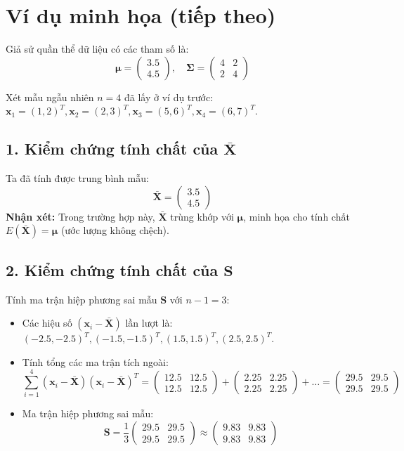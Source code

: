 \section*{Ví dụ minh họa (tiếp theo)}

Giả sử quần thể dữ liệu có các tham số là:
\[
\bm{\mu} = \begin{pmatrix} 3.5 \\ 4.5 \end{pmatrix}, \quad \bm{\Sigma} = \begin{pmatrix} 4 & 2 \\ 2 & 4 \end{pmatrix}
\]

Xét mẫu ngẫu nhiên $n=4$ đã lấy ở ví dụ trước:
$\bm{x}_1 = (1, 2)^T, \bm{x}_2 = (2, 3)^T, \bm{x}_3 = (5, 6)^T, \bm{x}_4 = (6, 7)^T$.

\subsection*{1. Kiểm chứng tính chất của $\bar{\bm{X}}$}
Ta đã tính được trung bình mẫu:
\[
\bar{\bm{X}} = \begin{pmatrix} 3.5 \\ 4.5 \end{pmatrix}
\]
\textbf{Nhận xét:} Trong trường hợp này, $\bar{\bm{X}}$ trùng khớp với $\bm{\mu}$, minh họa cho tính chất $E(\bar{\bm{X}}) = \bm{\mu}$ (ước lượng không chệch).

\subsection*{2. Kiểm chứng tính chất của $\bm{S}$}
Tính ma trận hiệp phương sai mẫu $\bm{S}$ với $n-1 = 3$:
\begin{itemize}
    \item Các hiệu số $(\bm{x}_i - \bar{\bm{X}})$ lần lượt là: $(-2.5, -2.5)^T, (-1.5, -1.5)^T, (1.5, 1.5)^T, (2.5, 2.5)^T$.
    \item Tính tổng các ma trận tích ngoài:
    \[
    \sum_{i=1}^{4} (\bm{x}_i - \bar{\bm{X}})(\bm{x}_i - \bar{\bm{X}})^T = \begin{pmatrix} 12.5 & 12.5 \\ 12.5 & 12.5 \end{pmatrix} + \begin{pmatrix} 2.25 & 2.25 \\ 2.25 & 2.25 \end{pmatrix} + \dots = \begin{pmatrix} 29.5 & 29.5 \\ 29.5 & 29.5 \end{pmatrix}
    \]
    \item Ma trận hiệp phương sai mẫu:
    \[
    \bm{S} = \frac{1}{3} \begin{pmatrix} 29.5 & 29.5 \\ 29.5 & 29.5 \end{pmatrix} \approx \begin{pmatrix} 9.83 & 9.83 \\ 9.83 & 9.83 \end{pmatrix}
    \]
\end{itemize}

